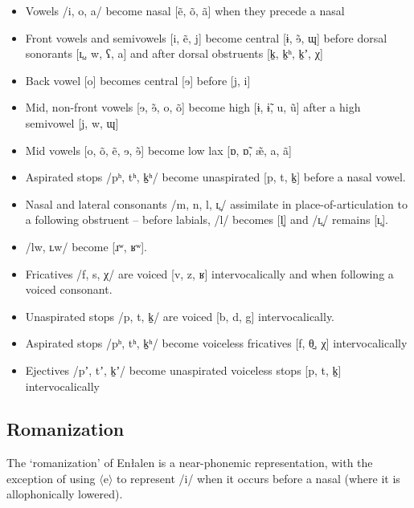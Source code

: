 \documentclass[a4paper,11pt,oneside,openany]{memoir}
\newcommand{\ortho}[1]{$\langle$#1$\rangle$}
\newcommand{\bripa}[1]{[#1]}
\newcommand{\phipa}[1]{/#1/}
\newcommand{\tht}{θ}
\newcommand{\alvr}{ɹ}
\newcommand{\vell}{ʟ}
\newcommand{\velr}{ʁ}
\newcommand{\velprox}{ɰ}
\newcommand{\uvux}{χ}
\newcommand{\pharox}{ʕ}
\newcommand{\bari}{ɨ}
\newcommand{\sche}{ɘ}
\newcommand{\ahoh}{ɒ}
\newcommand{\asp}{ʰ}
\newcommand{\lab}{ʷ}
\newcommand{\jekt}{ʼ}
\newcommand{\nav}{̃}
\newcommand{\bck}{̠}
\newcommand{\linglab}{̼}
\newcommand{\lang}{Enłalen}
\begin{document}
\begin{itemize}
    \item Vowels \phipa{i, o, a} become nasal \bripa{e\nav, o\nav, a\nav} when they precede a nasal
    \item Front vowels and semivowels \bripa{i, e\nav, j} become central \bripa{\bari, \sche\nav, \velprox} before dorsal sonorants \bripa{\vell\bck, w, \pharox, a} and after dorsal obstruents \bripa{k\bck, k\bck\asp, k\bck\jekt, \uvux}
    \item Back vowel \bripa{o} becomes central \bripa{\sche} before \bripa{j, i}
    \item Mid, non-front vowels \bripa{\sche, \sche\nav, o, o\nav} become high \bripa{\bari, \bari\nav, u, u\nav} after a high semivowel \bripa{j, w, \velprox}
    \item Mid vowels \bripa{o, o\nav, e\nav, \sche, \sche\nav} become low lax \bripa{\ahoh, \ahoh\nav, æ\nav, a, a\nav}
    \item Aspirated stops \phipa{p\asp, t\asp, k\bck\asp} become unaspirated \bripa{p, t, k\bck} before a nasal vowel.
    \item Nasal and lateral consonants \phipa{m, n, l, \vell\bck} assimilate in place-of-articulation to a following obstruent -- before labials, \phipa{l} becomes \bripa{l\linglab} and \phipa{\vell\bck} remains \bripa{\vell\bck}.
    \item \phipa{lw, \vell w} become \bripa{\alvr\lab, \velr\lab}.
    \item Fricatives \phipa{f, s, \uvux} are voiced \bripa{v, z, \velr} intervocalically and when following a voiced consonant.
    \item Unaspirated stops \phipa{p, t, k\bck} are voiced \bripa{b, d, g} intervocalically.
    \item Aspirated stops \phipa{p\asp, t\asp, k\bck\asp} become voiceless fricatives \bripa{f, \tht\bck, \uvux} intervocalically 
    \item Ejectives \phipa{p\jekt, t\jekt, k\bck\jekt} become unaspirated voiceless stops \bripa{p, t, k\bck} intervocalically 
\end{itemize}

\subsection{Romanization}

The `romanization' of \lang{} is a near-phonemic representation, with the exception of using \ortho{e} to represent \phipa{i} when it occurs before a nasal (where it is allophonically lowered).
\end{document}
